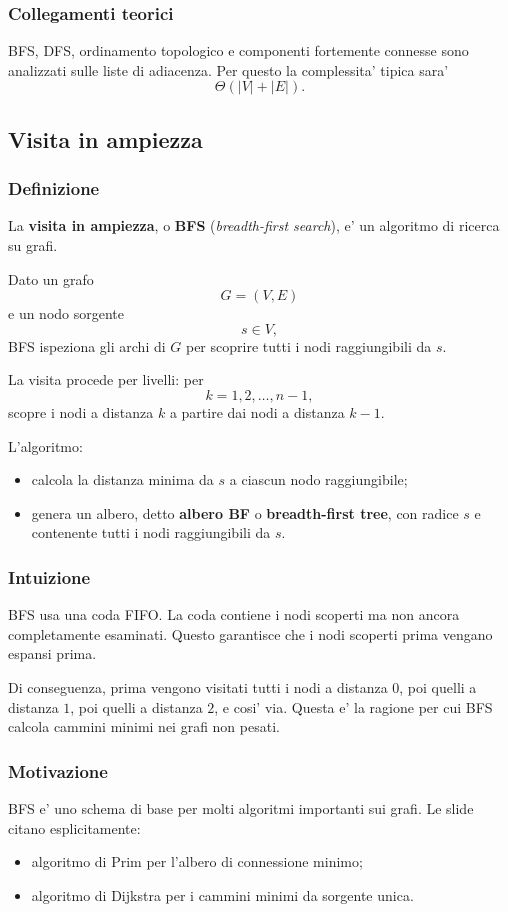 \subsubsection{Collegamenti teorici}
BFS, DFS, ordinamento topologico e componenti fortemente connesse sono analizzati sulle liste di adiacenza. Per questo la complessita' tipica sara'
\[
\Theta(|V|+|E|).
\]

\subsection{Visita in ampiezza}

\subsubsection{Definizione}
La \textbf{visita in ampiezza}, o \textbf{BFS} (\emph{breadth-first search}), e' un algoritmo di ricerca su grafi.

Dato un grafo
\[
G=(V,E)
\]
e un nodo sorgente
\[
s\in V,
\]
BFS ispeziona gli archi di $G$ per scoprire tutti i nodi raggiungibili da $s$.

La visita procede per livelli: per
\[
k=1,2,\ldots,n-1,
\]
scopre i nodi a distanza $k$ a partire dai nodi a distanza $k-1$.

L'algoritmo:
\begin{itemize}
	\item calcola la distanza minima da $s$ a ciascun nodo raggiungibile;
	\item genera un albero, detto \textbf{albero BF} o \textbf{breadth-first tree}, con radice $s$ e contenente tutti i nodi raggiungibili da $s$.
\end{itemize}

\subsubsection{Intuizione}
BFS usa una coda FIFO. La coda contiene i nodi scoperti ma non ancora completamente esaminati. Questo garantisce che i nodi scoperti prima vengano espansi prima.

Di conseguenza, prima vengono visitati tutti i nodi a distanza $0$, poi quelli a distanza $1$, poi quelli a distanza $2$, e cosi' via. Questa e' la ragione per cui BFS calcola cammini minimi nei grafi non pesati.

\subsubsection{Motivazione}
BFS e' uno schema di base per molti algoritmi importanti sui grafi. Le slide citano esplicitamente:
\begin{itemize}
	\item algoritmo di Prim per l'albero di connessione minimo;
	\item algoritmo di Dijkstra per i cammini minimi da sorgente unica.
\end{itemize}

